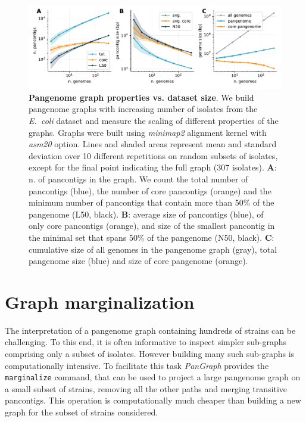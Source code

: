 \documentclass[aps,rmp,preprint,superscriptaddress,10pt,linenumbers]{revtex4-1}
\begin{document}
\begin{figure}[htb]
    \includegraphics[width=.9\textwidth]{figs/incr_size.pdf}
    \caption{{\bf Pangenome graph properties vs. dataset size}.
        We build pangenome graphs with increasing number of isolates from the \textit{E.~coli} dataset and measure the scaling of different properties of the graphs. Graphs were built using \textit{minimap2} alignment kernel with \textit{asm20} option. Lines and shaded areas represent mean and standard deviation over 10 different repetitions on random subsets of isolates, except for the final point indicating the full graph (307 isolates).
        \textbf{A}: n. of pancontigs in the graph. We count the total number of pancontigs (blue), the number of core pancontigs (orange) and the minimum number of pancontigs that contain more than 50\% of the pangenome (L50, black).
        \textbf{B}: average size of pancontigs (blue), of only core pancontigs (orange), and size of the smallest pancontig in the minimal set that spans 50\% of the pangenome (N50, black).
        \textbf{C}: cumulative size of all genomes in the pangenome graph (gray), total pangenome size (blue) and size of core pangenome (orange).
    }
    \label{fig:panx-size}
\end{figure}

\section{Graph marginalization}

The interpretation of a pangenome graph containing hundreds of strains can be challenging. To this end, it is often informative to inspect simpler sub-graphs comprising only a subset of isolates. However building many such sub-graphs is computationally intensive. To facilitate this task \textit{PanGraph} provides the \verb|marginalize| command, that can be used to project a large pangenome graph on a small subset of strains, removing all the other paths and merging transitive pancontigs. This operation is computationally much cheaper than building a new graph for the subset of strains considered.
\end{document}
